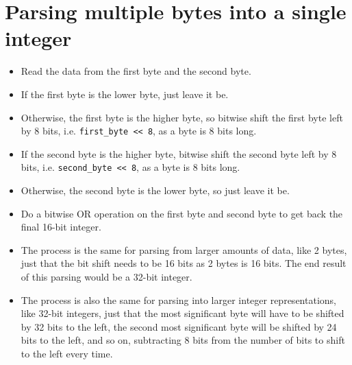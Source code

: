 \documentclass[11pt]{article}
\begin{document}
\section{Parsing multiple bytes into a single integer}
\label{sec:org1bb60d5}
\begin{itemize}
\item Read the data from the first byte and the second byte.
\item If the first byte is the lower byte, just leave it be.
\item Otherwise, the first byte is the higher byte, so bitwise shift the first byte left by 8 bits, i.e. \texttt{first\_byte <{}<{} 8}, as a byte is 8 bits long.
\item If the second byte is the higher byte, bitwise shift the second byte left by 8 bits, i.e. \texttt{second\_byte <{}<{} 8}, as a byte is 8 bits long.
\item Otherwise, the second byte is the lower byte, so just leave it be.
\item Do a bitwise OR operation on the first byte and second byte to get back the final 16-bit integer.
\item The process is the same for parsing from larger amounts of data, like 2 bytes, just that the bit shift needs to be 16 bits as 2 bytes is 16 bits. The end result of this parsing would be a 32-bit integer.
\item The process is also the same for parsing into larger integer representations, like 32-bit integers, just that the most significant byte will have to be shifted by 32 bits to the left, the second most significant byte will be shifted by 24 bits to the left, and so on, subtracting 8 bits from the number of bits to shift to the left every time.
\end{itemize}
\end{document}
